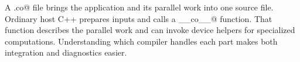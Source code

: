 A \co@.co@ file brings the application and its parallel work into one source file. Ordinary host C++ prepares inputs and calls a \co@__co__@ function. That function describes the parallel work and can invoke device helpers for specialized computations. Understanding which compiler handles each part makes both integration and diagnostics easier.

